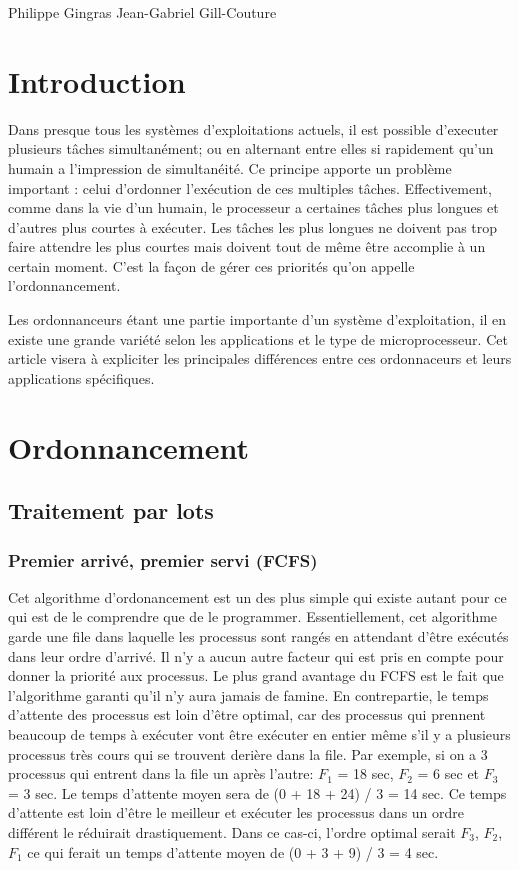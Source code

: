 \documentclass{article}
\begin{document}
\noindent Philippe Gingras
\newline
Jean-Gabriel Gill-Couture
\newpage
\section{Introduction}
Dans presque tous les systèmes d'exploitations actuels, il est possible d'executer plusieurs tâches simultanément; ou en alternant entre elles si rapidement qu'un humain a l'impression de simultanéité. Ce principe apporte un problème important : celui d'ordonner l'exécution de ces multiples tâches. Effectivement, comme dans la vie d'un humain, le processeur a certaines tâches plus longues et d'autres plus courtes à exécuter. Les tâches les plus longues ne doivent pas trop faire attendre les plus courtes mais doivent tout de même être accomplie à un certain moment. C'est la façon de gérer ces priorités qu'on appelle l'ordonnancement.
\newline
\newline

Les ordonnanceurs étant une partie importante d'un système d'exploitation, il en existe une grande variété selon les applications et le type de microprocesseur. Cet article visera à expliciter les principales différences entre ces ordonnaceurs et leurs applications spécifiques.


\section{Ordonnancement}

\subsection{Traitement par lots}
\subsubsection{Premier arrivé, premier servi (FCFS)}
Cet algorithme d'ordonancement est un des plus simple qui existe autant pour ce qui est de le comprendre que de le programmer. Essentiellement, cet algorithme garde une file dans laquelle les processus sont rangés en attendant d'être exécutés dans leur ordre d'arrivé. Il n'y a aucun autre facteur qui est pris en compte pour donner la priorité aux processus. Le plus grand avantage du FCFS est le fait que l'algorithme garanti qu'il n'y aura jamais de famine. En contrepartie, le temps d'attente des processus est loin d'être optimal, car des processus qui prennent beaucoup de temps à exécuter vont être exécuter en entier même s'il y a plusieurs processus très cours qui se trouvent derière dans la file. 
\newline
\newline
Par exemple, si on a 3 processus qui entrent dans la file un après l'autre:  $F_1$ = 18 sec, $F_2$ = 6 sec et $F_3$ = 3 sec. Le temps d'attente moyen sera de (0 + 18 + 24) / 3 = 14 sec. Ce temps d'attente est loin d'être le meilleur et exécuter les processus dans un ordre différent le réduirait drastiquement. Dans ce cas-ci, l'ordre optimal serait $F_3$, $F_2$, $F_1$ ce qui ferait un temps d'attente moyen de (0 + 3 + 9) / 3 = 4 sec.
\end{document}
